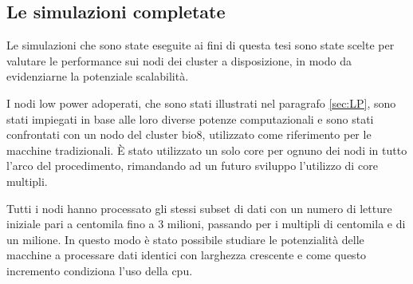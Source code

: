 %
%
 
\subsection{Le simulazioni completate} 
\label{subsec:simc}
Le simulazioni che sono state eseguite ai fini di questa tesi sono state scelte per valutare le performance sui nodi dei cluster a disposizione, in modo da evidenziarne la potenziale scalabilità.

I nodi low power adoperati, che sono stati illustrati nel paragrafo \ref{sec:LP}, sono stati impiegati in base alle loro diverse potenze computazionali e sono stati confrontati con un nodo del cluster bio8, utilizzato come riferimento per le macchine tradizionali.
È stato utilizzato un solo core per ognuno dei nodi in tutto l'arco del procedimento, rimandando ad un futuro sviluppo l'utilizzo di core multipli.  


Tutti i nodi hanno processato gli stessi subset di dati con un numero di letture iniziale pari a centomila fino a 3 milioni, passando per i multipli di centomila e di un milione.
In questo modo è stato possibile studiare le potenzialità delle macchine a processare dati identici con larghezza crescente e come questo incremento condiziona l'uso della cpu. 

